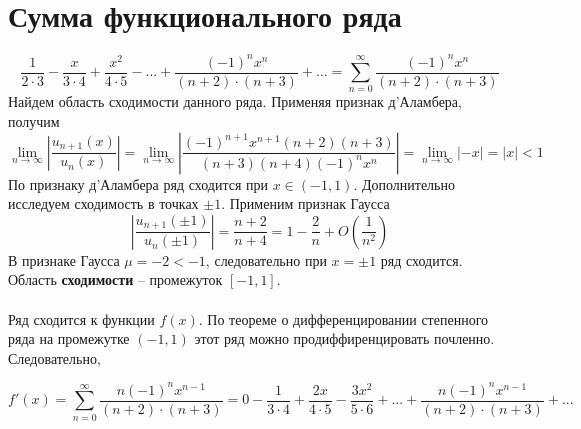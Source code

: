 \documentclass[a5paper, 10pt]{article}
\theoremstyle{definition}
\theoremstyle{plain}
\theoremstyle{remark}
\begin{document}
\section{Сумма функционального ряда}
\begin{equation*}
\frac{1}{2 \cdot 3} - \frac{x}{3 \cdot 4} + \frac{x^2}{4 \cdot 5} - ... + \frac{(-1)^n x^n}{(n+ 2) \cdot(n+ 3)} + ... = 
\sum  \limits_{n = 0}^{\infty} \frac{(-1)^n x^n}{(n+ 2) \cdot(n+ 3)}
\end{equation*}
Найдем область сходимости данного ряда. Применяя признак  д'Аламбера, получим
\begin{equation*}
\lim_{n \to \infty} \left| \frac{u_{n+1} (x)}{u_{n} (x)} \right| =
 \lim_{n \to \infty}  \left| \frac{(-1)^{n+1} x^{n+1}(n+ 2) (n+ 3)}{(n+ 3) (n+ 4) (-1)^n x^n} \right| = 
 \lim_{n \to \infty}  \left| - x \right| = \left|  x \right|  < 1
\end{equation*}
По признаку д'Аламбера ряд сходится при $ x \in (-1, 1)$. Дополнительно исследуем сходимость в точках $\pm 1$. Применим признак Гаусса
\begin{equation*}
 \left| \frac{u_{n+1} (\pm 1)}{u_{n} (\pm 1)} \right| = \frac{n+ 2}{n+ 4} = 1 - \frac{2}{n} + O\left(\frac{1}{n^2} \right)
\end{equation*}
В признаке Гаусса $\mu = -2 < -1$, следовательно при $x = \pm 1$ ряд сходится.\\
Область \textbf{сходимости} -- промежуток $[-1, 1]$.\\\\
Ряд сходится к функции $f(x)$. По теореме о дифференцировании степенного ряда на промежутке $ (-1, 1)$ этот ряд можно продиффиренцировать почленно. Следовательно,

\begin{equation*}
f'(x) = \sum  \limits_{n = 0}^{\infty} \frac{n (-1)^n x^{n-1}}{(n+ 2) \cdot(n+ 3)} = 
0 - \frac{1}{3 \cdot 4} + \frac{2x}{4 \cdot 5} - \frac{3x^2}{5 \cdot 6}+... + \frac{n (-1)^n x^{n-1}}{(n+ 2) \cdot(n+ 3)} +...
\end{equation*}
\end{document}
